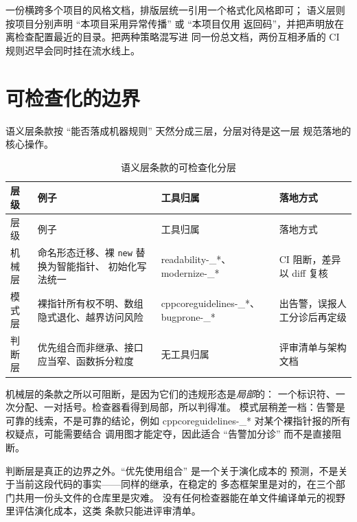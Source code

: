 \documentclass[12pt,a4paper,fontset=fandol]{ctexbook}
\newcommand{\Tp}[1]{\texttt{#1}}
\begin{document}
\begin{note}[title={多项目风格文档的分层引用法}]
一份横跨多个项目的风格文档，排版层统一引用一个格式化风格即可；
语义层则按项目分别声明 ``本项目采用异常传播'' 或 ``本项目仅用
返回码''，并把声明放在离检查配置最近的目录。把两种策略混写进
同一份总文档，两份互相矛盾的 CI 规则迟早会同时挂在流水线上。
\end{note}

\section{可检查化的边界}
\label{sec:ch05-lintable}

语义层条款按 ``能否落成机器规则'' 天然分成三层，分层对待是这一层
规范落地的核心操作。

\begin{longtable}{>{\raggedright\arraybackslash}p{}
  >{\raggedright\arraybackslash}p{}
  >{\raggedright\arraybackslash}p{}
  >{\raggedright\arraybackslash}p{}}
\caption{语义层条款的可检查化分层}\label{tab:ch05-lint}\\
\toprule
层级 & 例子 & 工具归属 & 落地方式 \\
\midrule
\endfirsthead
\toprule
层级 & 例子 & 工具归属 & 落地方式 \\
\midrule
\endhead
机械层 & 命名形态迁移、裸 \Tp{new} 替换为智能指针、
  初始化写法统一 & readability-\_*、modernize-\_* &
  CI 阻断，差异以 diff 复核 \\
\addlinespace
模式层 & 裸指针所有权不明、数组隐式退化、越界访问风险 &
  cppcore\allowbreak guidelines-\allowbreak \_*、bugprone-\_* &
  出告警，误报人工分诊后再定级 \\
\addlinespace
判断层 & 优先组合而非继承、接口应当窄、函数拆分粒度 &
  无工具归属 & 评审清单与架构文档 \\
\bottomrule
\end{longtable}

机械层的条款之所以可阻断，是因为它们的违规形态是\emph{局部}的：
一个标识符、一次分配、一对括号。检查器看得到局部，所以判得准。
模式层稍差一档：告警是可靠的线索，不是可靠的结论，例如
cppcore\allowbreak guidelines-\allowbreak \_* 对某个裸指针报的所有权疑点，可能需要结合
调用图才能定夺，因此适合 ``告警加分诊'' 而不是直接阻断。

判断层是真正的边界之外。``优先使用组合'' 是一个关于演化成本的
预测，不是关于当前这段代码的事实——同样的继承，在稳定的
多态框架里是对的，在三个部门共用一份头文件的仓库里是灾难。
没有任何检查器能在单文件编译单元的视野里评估演化成本，这类
条款只能进评审清单。
\end{document}
